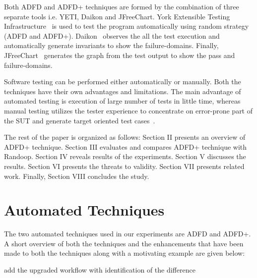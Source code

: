 \documentclass[runningheads,a4paper]{llncs}
\begin{document}
Both ADFD and ADFD+ techniques are formed by the combination of three separate tools i.e. YETI, Daikon and JFreeChart. York Extensible Testing Infrastructure~\cite{Oriol2011yeti} is used to test the program automatically using random strategy (ADFD and ADFD+). Daikon~\cite{ernst2007daikon} observes the all the test execution and automatically generate invariants to show the failure-domains. Finally, JFreeChart~\cite{gilbert2008jfreechart} generates the graph from the test output to show the pass and failure-domains. 

Software testing can be performed either automatically or manually. Both the techniques have their own advantages and limitations. The main advantage of automated testing is execution of large number of tests in little time, whereas manual testing utilizes the tester experience to concentrate on error-prone part of the SUT and generate target oriented test cases~\cite{Leitner2007}. 











The rest of the paper is organized as follows: Section II presents an overview of ADFD+ technique. Section III evaluates and compares ADFD+ technique with Randoop. Section IV reveals results of the experiments. Section V discusses the results. Section VI presents the threats to validity. Section VII presents related work. Finally, Section VIII concludes the study.


 


\section{Automated Techniques}
The two automated techniques used in our experiments are ADFD and ADFD+. A short overview of both the techniques and the enhancements that have been made to both the techniques along with a motivating example are given below:


 add the upgraded workflow with identification of the difference 
\end{document}
